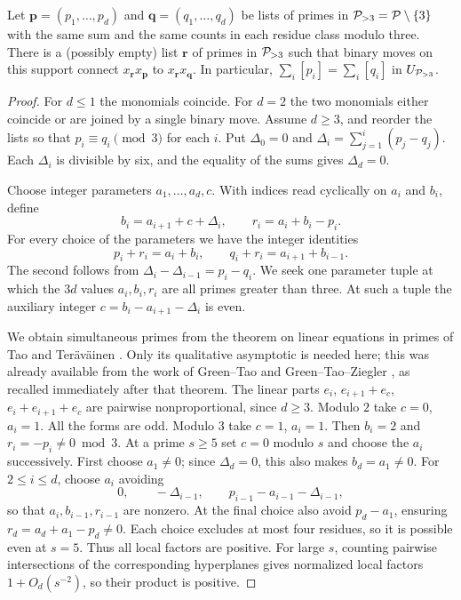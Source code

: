 \begin{lemma}\label{depth:prime-pair-conversion}
Let $\boldsymbol p=(p_1,\ldots,p_d)$ and $\boldsymbol q=(q_1,\ldots,q_d)$
be lists of primes in $\mathcal P_{>3}=\mathcal P\setminus\{3\}$ with the same sum
and the same counts in each residue class modulo three. There is a
(possibly empty) list $\boldsymbol r$ of primes in $\mathcal P_{>3}$ such
that binary moves on this support connect $x_{\boldsymbol r}x_{\boldsymbol p}$
to $x_{\boldsymbol r}x_{\boldsymbol q}$. In particular,
$\sum_i[p_i]=\sum_i[q_i]$ in $U_{\mathcal P_{>3}}$.
\end{lemma}
\begin{proof}
For $d\le1$ the monomials coincide. For $d=2$ the two monomials
either coincide or are joined by a single binary move.
Assume $d\ge3$, and reorder the lists so that
$p_i\equiv q_i\pmod3$ for each $i$.
Put $\Delta_0=0$ and $\Delta_i=\sum_{j=1}^i(p_j-q_j)$.
Each $\Delta_i$ is divisible by six, and the equality of the sums gives
$\Delta_d=0$.

Choose integer parameters $a_1,\ldots,a_d,c$. With indices read cyclically
on $a_i$ and $b_i$, define
\[
 b_i=a_{i+1}+c+\Delta_i,\qquad r_i=a_i+b_i-p_i .
\]
For every choice of the parameters we have the integer identities
\[
 p_i+r_i=a_i+b_i,\qquad q_i+r_i=a_{i+1}+b_{i-1}.
\]
The second follows from $\Delta_i-\Delta_{i-1}=p_i-q_i$.
We seek one parameter tuple at which the $3d$ values $a_i,b_i,r_i$
are all primes greater than three. At such a tuple the auxiliary
integer $c=b_i-a_{i+1}-\Delta_i$ is even.

We obtain simultaneous primes from the theorem on linear equations
in primes of Tao and Ter\"av\"ainen \cite[Theorem~1.6]{TT}.
Only its qualitative asymptotic is needed here; this was already
available from the work of Green--Tao and Green--Tao--Ziegler
\cite{GT10,GT12,GTZ12}, as recalled immediately after that theorem.
The linear parts $e_i$, $e_{i+1}+e_c$, $e_i+e_{i+1}+e_c$ are pairwise
nonproportional, since $d\ge3$. Modulo $2$ take $c=0$, $a_i=1$.
All the forms are odd. Modulo $3$ take $c=1$, $a_i=1$. Then $b_i=2$ and
$r_i=-p_i\ne0\bmod3$. At a prime $s\ge5$ set $c=0$ modulo $s$ and choose
the $a_i$ successively. First choose $a_1\ne0$; since $\Delta_d=0$,
this also makes $b_d=a_1\ne0$. For $2\le i\le d$, choose $a_i$ avoiding
\[
 0,\qquad -\Delta_{i-1},\qquad
 p_{i-1}-a_{i-1}-\Delta_{i-1},
\]
so that $a_i,b_{i-1},r_{i-1}$ are nonzero.
At the final choice also avoid $p_d-a_1$, ensuring
$r_d=a_d+a_1-p_d\ne0$. Each choice excludes at most four residues,
so it is possible even at $s=5$. Thus all local factors are positive.
For large $s$, counting pairwise intersections of the corresponding
hyperplanes gives normalized local factors $1+O_d(s^{-2})$, so
their product is positive.


\end{proof}
